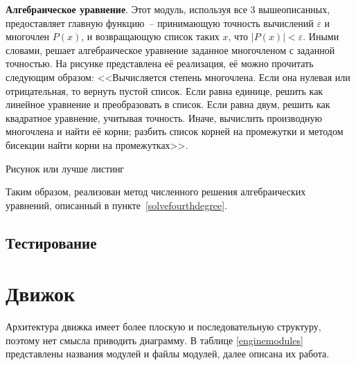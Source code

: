 \textbf{Алгебраическое уравнение}. Этот модуль, используя все 3 вышеописанных, предоставляет главную функцию~-- принимающую
точность вычислений \(\varepsilon\) и многочлен \(P(x)\), и возвращающую список таких \(x\), что \(\left|P(x)\right| < \varepsilon\).
Иными словами, решает алгебраическое уравнение заданное многочленом с заданной точностью. На рисунке \TODO представлена её реализация, её можно прочитать следующим образом:
<<Вычисляется степень многочлена.
Если она нулевая или отрицательная, то вернуть пустой список.
Если равна единице, решить как линейное уравнение и преобразовать в список.
Если равна двум, решить как квадратное уравнение, учитывая точность.
Иначе, вычислить производную многочлена и найти её корни; разбить список корней на промежутки и методом бисекции найти корни на промежутках>>.

\TODO Рисунок или лучше листинг

Таким образом, реализован метод численного решения алгебраических уравнений, описанный в пункте~\ref{solvefourthdegree}.

\subsection{Тестирование}

\TODO

\section{Движок}\label{engine}

Архитектура движка имеет более плоскую и последовательную структуру, поэтому нет смысла приводить диаграмму.
В таблице \ref{enginemodules} представлены названия модулей и файлы модулей, далее описана их работа.

